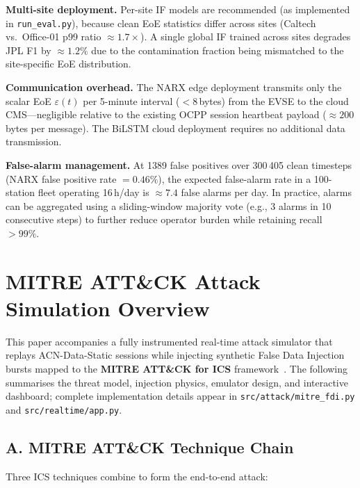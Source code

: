 \documentclass[journal]{IEEEtran}
\begin{document}
\textbf{Multi-site deployment.}
Per-site IF models are recommended (as implemented in \texttt{run\_eval.py}),
because clean EoE statistics differ across sites
(Caltech vs.\ Office-01 p99 ratio $\approx1.7\times$).
A single global IF trained across sites degrades JPL F1 by
$\approx1.2\%$ due to the contamination fraction being mismatched
to the site-specific EoE distribution.

\textbf{Communication overhead.}
The NARX edge deployment transmits only the scalar EoE
$\varepsilon(t)$ per 5-minute interval ($<8$\,bytes) from the
EVSE to the cloud CMS---negligible relative to the existing OCPP
session heartbeat payload ($\approx200$\,bytes per message).
The BiLSTM cloud deployment requires no additional data transmission.

\textbf{False-alarm management.}
At 1389 false positives over 300\,405 clean timesteps
(NARX false positive rate $= 0.46\%$), the expected false-alarm
rate in a 100-station fleet operating 16\,h/day is
$\approx7.4$ false alarms per day.
In practice, alarms can be aggregated using a sliding-window
majority vote (e.g., 3 alarms in 10 consecutive steps) to further
reduce operator burden while retaining recall $>99\%$.

\section*{MITRE ATT\&CK Attack Simulation Overview}
\label{sec:mitre_overview}

This paper accompanies a fully instrumented real-time attack simulator
that replays ACN-Data-Static sessions while injecting synthetic False
Data Injection bursts mapped to the \textbf{MITRE ATT\&CK for ICS}
framework~\cite{mitre_ics}.
The following summarises the threat model, injection physics, emulator
design, and interactive dashboard; complete implementation details
appear in \texttt{src/attack/mitre\_fdi.py} and
\texttt{src/realtime/app.py}.

\subsection*{A.\; MITRE ATT\&CK Technique Chain}

Three ICS techniques combine to form the end-to-end attack:
\end{document}
